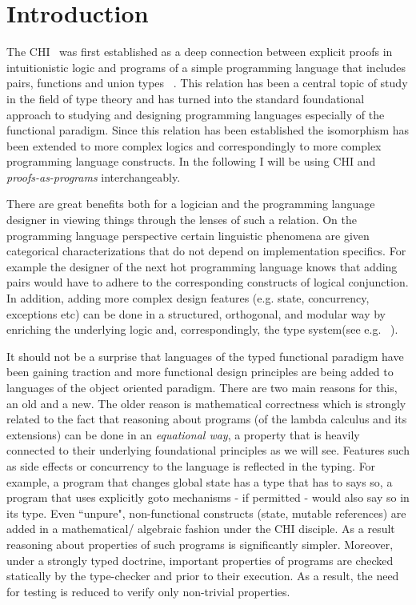 \chapter{Introduction}\label{intro}
The \acrfull{CHI}~\cite{curry1934functionality,howard1995formulae} was first established as a deep connection between explicit proofs in intuitionistic logic and programs of a simple programming 
language that includes pairs, functions and union types ~\cite{Pierce:2002:TPL:509043,Srensen98lectureson}. This relation has been a central topic of study in the field of type theory and has turned into the standard
foundational approach to studying and designing programming languages especially of the functional paradigm. Since  this relation has been  established the 
isomorphism has been extended to more complex logics and correspondingly to more complex programming language constructs.  
In the following I will be using \acrfull{CHI} and \emph{proofs-as-programs} interchangeably.

There are great benefits both for a logician
and the programming language designer in viewing things through the lenses of such a relation. On the programming language perspective certain linguistic phenomena are given categorical characterizations that do not 
depend on implementation specifics. 
For example the designer of the next hot programming language  
knows that adding pairs would have to adhere to the corresponding constructs of 
logical conjunction. In addition, adding more complex design features 
(e.g. state, concurrency, exceptions etc) can be done in a structured, orthogonal, 
and modular way by enriching the underlying logic  and, 
correspondingly, the type system(see e.g. ~\cite{Harper:2012:PFP:2431407,CERVESATO20091044,Ong:1997:CFF:263699.263722,DBLP:conf/popl/Griffin90}).

It should not be a surprise that languages of the typed functional paradigm  
have been gaining traction and more functional design principles are being added 
to languages of the object oriented paradigm. There are two main reasons for this, 
an old and a new. The older reason is mathematical correctness which is strongly 
related to the fact that reasoning about programs (of the lambda calculus and its extensions) 
can be done in an \textit{equational way}, a property that is heavily connected 
to their underlying foundational principles as we will see. Features such as side effects or concurrency 
to the language is reflected in the typing. For example,  
a program that changes global state has a type that has to  says so, 
a program that uses explicitly goto mechanisms - if permitted - would also say so in its type. Even ``unpure", non-functional constructs (state, mutable references) are added in a mathematical/ algebraic fashion under the \ac{CHI} disciple. As a result  reasoning about properties of such programs is significantly simpler. Moreover, under a strongly typed doctrine, important properties of programs are checked statically by the type-checker and prior to their execution. 
As a result, the need for testing is reduced to verify only non-trivial properties. 


